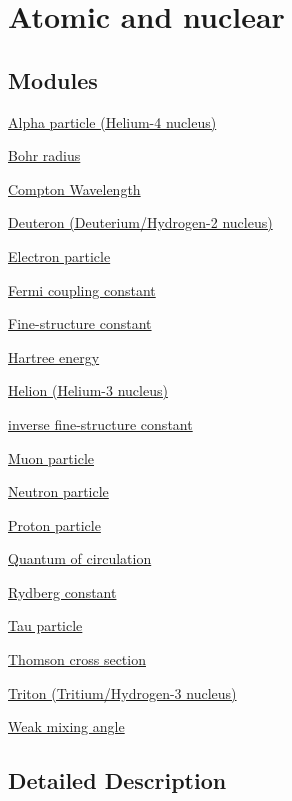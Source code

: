 \hypertarget{group___atomic}{}\section{Atomic and nuclear}
\label{group___atomic}
\subsection*{Modules}
\begin{DoxyCompactItemize}
\item 
\hyperlink{group___alpha}{Alpha particle (\+Helium-\/4 nucleus)}
\item 
\hyperlink{group___bohr_radius}{Bohr radius}
\item 
\hyperlink{group___compton_wavelength}{Compton Wavelength}
\item 
\hyperlink{group___deuteron}{Deuteron (\+Deuterium/\+Hydrogen-\/2 nucleus)}
\item 
\hyperlink{group___electron}{Electron particle}
\item 
\hyperlink{group___fermi_coupling_constant}{Fermi coupling constant}
\item 
\hyperlink{group___fine_structure_constant}{Fine-\/structure constant}
\item 
\hyperlink{group___hartree_energy}{Hartree energy}
\item 
\hyperlink{group___helion}{Helion (\+Helium-\/3 nucleus)}
\item 
\hyperlink{group___inverse_fine_structure_constant}{inverse fine-\/structure constant}
\item 
\hyperlink{group___muon}{Muon particle}
\item 
\hyperlink{group___neutron}{Neutron particle}
\item 
\hyperlink{group___proton}{Proton particle}
\item 
\hyperlink{group___quantum_of_circulation}{Quantum of circulation}
\item 
\hyperlink{group___rydberg_constant}{Rydberg constant}
\item 
\hyperlink{group___tau}{Tau particle}
\item 
\hyperlink{group___thomson}{Thomson cross section}
\item 
\hyperlink{group___triton}{Triton (\+Tritium/\+Hydrogen-\/3 nucleus)}
\item 
\hyperlink{group___weak_mixing_angle}{Weak mixing angle}
\end{DoxyCompactItemize}


\subsection{Detailed Description}
